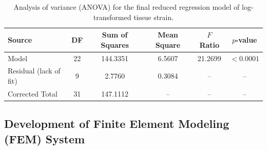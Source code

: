 \documentclass[fleqn,10pt]{wlscirep}
\begin{document}
\begin{table}[h!]
\centering
\caption{Analysis of variance (ANOVA) for the final reduced regression model of log-transformed tissue strain.}
\label{tab:anova}
\begin{tabular}{lccccc}
\hline
\textbf{Source} & \textbf{DF} & \textbf{Sum of Squares} & \textbf{Mean Square} & \textbf{$F$ Ratio} & \textbf{$p$-value} \\
\hline
Model & 22 & 144.3351 & 6.5607 & 21.2699 & $<0.0001$ \\
Residual (lack of fit) & 9 & 2.7760 & 0.3084 & -- & -- \\
Corrected Total & 31 & 147.1112 & -- & -- & -- \\
\hline
\end{tabular}
\end{table}

\subsection{Development of Finite Element Modeling (FEM) System}
\end{document}
